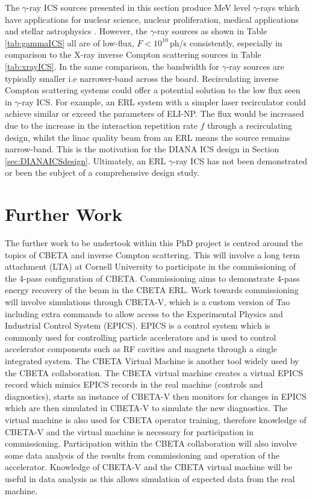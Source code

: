 \documentclass[11pt]{article}
\begin{document}
The $\gamma$-ray ICS sources presented in this section produce MeV level $\gamma$-rays which have applications for nuclear science, nuclear proliferation, medical applications and stellar astrophysics \cite{PWDIANA}. However, the $\gamma$-ray sources as shown in Table \ref{tab:gammaICS} all are of low-flux, $F < 10^{10}$\,ph/s consistently, especially in comparison to the X-ray inverse Compton scattering sources in Table \ref{tab:xrayICS}. In the same comparison, the bandwidth for $\gamma$-ray sources are typically smaller i.e narrower-band across the board. Recirculating inverse Compton scattering systems could offer a potential solution to the low flux seen in $\gamma$-ray ICS. For example, an ERL system with a simpler laser recirculator could achieve similar or exceed the parameters of ELI-NP. The flux would be increased due to the increase in the interaction repetition rate $f$ through a recirculating design, whilst the linac quality beam from an ERL means the source remains narrow-band. This is the motivation for the DIANA ICS design in Section \ref{sec:DIANAICSdesign}. Ultimately, an ERL $\gamma$-ray ICS has not been demonstrated or been the subject of a comprehensive design study.    

\section{Further Work}

The further work to be undertook within this PhD project is centred around the topics of CBETA and inverse Compton scattering. This will involve a long term attachment (LTA) at Cornell University to participate in the commissioning of the 4-pass configuration of CBETA. Commissioning aims to demonstrate 4-pass energy recovery of the beam in the CBETA ERL. Work towards commissioning will involve simulations through CBETA-V, which is a custom version of Tao \cite{Tao} including extra commands to allow access to the Experimental Physics and Industrial Control System (EPICS). EPICS is a control system which is commonly used for controlling particle accelerators and is used to control accelerator components such as RF cavities and magnets through a single integrated system. The CBETA Virtual Machine is another tool widely used by the CBETA collaboration. The CBETA virtual machine creates a virtual EPICS record which mimics EPICS records in the real machine (controls and diagnostics), starts an instance of CBETA-V then monitors for changes in EPICS which are then simulated in CBETA-V to simulate the new diagnostics. The virtual machine is also used for CBETA operator training, therefore knowledge of CBETA-V and the virtual machine is necessary for participation in commissioning. Participation within the CBETA collaboration will also involve some data analysis of the results from commissioning and operation of the accelerator. Knowledge of CBETA-V and the CBETA virtual machine will be useful in data analysis as this allows simulation of expected data from the real machine. 
\end{document}
